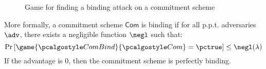 \begin{figure}[tbhp]
  \begin{center}
    \begin{tcolorbox}[width=8cm]
      \begin{pchstack}[center]
      \end{pchstack}
    \end{tcolorbox}
  \end{center}
  \caption{Game for finding a binding attack on a commitment scheme \label{fig:break-com-bind}}
\end{figure}


More formally, a commitment scheme $\mathsf{Com}$ is binding if for all p.p.t. adversaries $\adv$, there exists a negligible function $\negl$ such that:
\[ \pr{\game{\algo{ComBind}}{\algo{Com}} = \pctrue} \leq \negl(\lambda) \]
If the advantage is 0, then the commitment scheme is perfectly binding.






